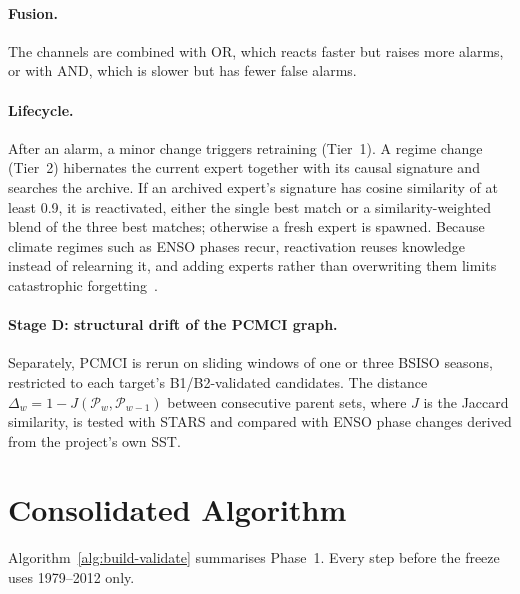 \paragraph{Fusion.} The channels are combined with OR, which reacts faster but raises more alarms, or with AND, which is slower but has fewer false alarms.

\paragraph{Lifecycle.} After an alarm, a minor change triggers retraining (Tier~1). A regime change (Tier~2) hibernates the current expert together with its causal signature and searches the archive. If an archived expert's signature has cosine similarity of at least 0.9, it is reactivated, either the single best match or a similarity-weighted blend of the three best matches; otherwise a fresh expert is spawned. Because climate regimes such as ENSO phases recur, reactivation reuses knowledge instead of relearning it, and adding experts rather than overwriting them limits catastrophic forgetting~\cite{kirkpatrick2017overcoming}.

\paragraph{Stage D: structural drift of the PCMCI graph.} Separately, PCMCI is rerun on sliding windows of one or three BSISO seasons, restricted to each target's B1/B2-validated candidates. The distance $\Delta_w=1-J(\mathcal{P}_w,\mathcal{P}_{w-1})$ between consecutive parent sets, where $J$ is the Jaccard similarity, is tested with STARS and compared with ENSO phase changes derived from the project's own SST.

\section{Consolidated Algorithm}
\label{sec:moe-algorithm}

Algorithm~\ref{alg:build-validate} summarises Phase~1. Every step before the freeze uses 1979--2012 only.

